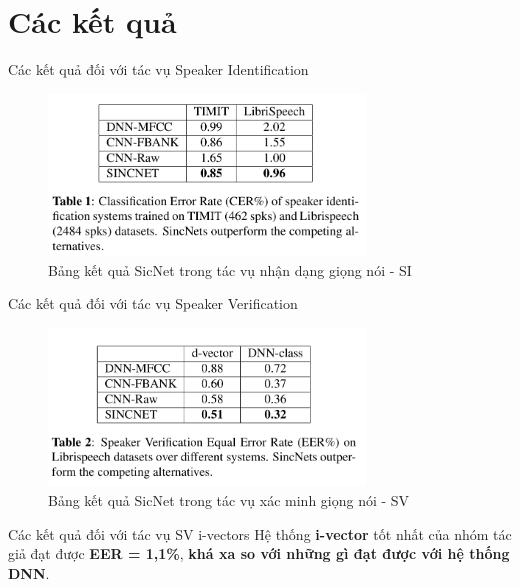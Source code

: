 \documentclass[11pt]{beamer}
\begin{document}
\section{Các kết quả}
\begin{frame}{Các kết quả đối với tác vụ Speaker Identification}
\begin{figure}[H]
	\centering
	\includegraphics[width=0.75\textwidth]{images/performance_speaker_identification.png}
	\caption{Bảng kết quả SicNet trong tác vụ nhận dạng giọng nói - SI}
	\label{fig:writing-thesis}
\end{figure}	
\end{frame}
\begin{frame}{Các kết quả đối với tác vụ Speaker Verification}
\begin{figure}[H]
	\centering
	\includegraphics[width=0.75\textwidth]{images/performance_speaker_verification.png}
	\caption{Bảng kết quả SicNet trong tác vụ xác minh giọng nói - SV}
	\label{fig:writing-thesis}
\end{figure}	
\end{frame}
\begin{frame}{Các kết quả đối với tác vụ SV i-vectors}
	Hệ thống \textbf{i-vector} tốt nhất của nhóm tác giả đạt được \textbf{EER = 1,1\%}, \textbf{khá xa so với những gì đạt được với hệ thống DNN}.	
\end{frame}
\end{document}
